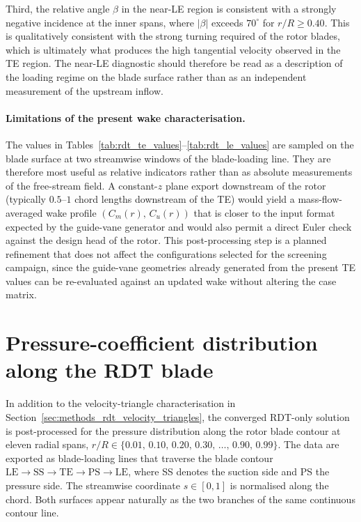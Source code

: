 Third, the relative angle $\beta$ in the near-LE region is consistent
with a strongly negative incidence at the inner spans, where $|\beta|$
exceeds $70^\circ$ for $r/R\geq 0.40$. This is qualitatively consistent
with the strong turning required of the rotor blades, which is
ultimately what produces the high tangential velocity observed in the
TE region. The near-LE diagnostic should therefore be read as a
description of the loading regime on the blade surface rather than as
an independent measurement of the upstream inflow.
 
\paragraph{Limitations of the present wake characterisation.}
The values in Tables~\ref{tab:rdt_te_values}--\ref{tab:rdt_le_values}
are sampled on the blade surface at two streamwise windows of the
blade-loading line. They are therefore most useful as relative
indicators rather than as absolute measurements of the free-stream
field. A constant-$z$ plane export downstream of the rotor (typically
$0.5$--$1$ chord lengths downstream of the TE) would yield a
mass-flow-averaged wake profile $(C_m(r),\,C_u(r))$ that is closer to
the input format expected by the guide-vane generator and would also
permit a direct Euler check against the design head of the rotor. This
post-processing step is a planned refinement that does not affect the
configurations selected for the screening campaign, since the guide-vane
geometries already generated from the present TE values can be
re-evaluated against an updated wake without altering the case matrix.

\section{Pressure-coefficient distribution along the RDT blade}
\label{sec:methods_rdt_cp}
 
In addition to the velocity-triangle characterisation in
Section~\ref{sec:methods_rdt_velocity_triangles}, the converged RDT-only
solution is post-processed for the pressure distribution along the
rotor blade contour at eleven radial spans, $r/R\in\{0.01,\,0.10,\,
0.20,\,0.30,\,\ldots,\,0.90,\,0.99\}$. The data are exported as
blade-loading lines that traverse the blade contour
$\mathrm{LE}\to\mathrm{SS}\to\mathrm{TE}\to\mathrm{PS}\to\mathrm{LE}$,
where SS denotes the suction side and PS the pressure side. The
streamwise coordinate $s\in[0,1]$ is normalised along the chord. Both
surfaces appear naturally as the two branches of the same continuous
contour line.
 
